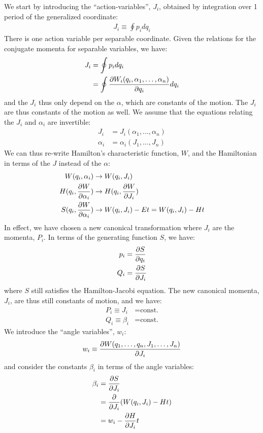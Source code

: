 We start by introducing the ``action-variables'', $J_i$, obtained by integration over 1 period of the generalized coordinate:
\begin{align}
J_i\equiv \oint p_idq_i
\end{align}
There is one action variable per separable coordinate. Given the relations for the conjugate momenta for separable variables, we have:
\begin{align}
J_i&=\oint p_idq_i\nonumber\\
&=\oint \frac{\partial W_i(q_i, \alpha_1, \dots , \alpha_n)}{\partial q_i} dq_i \nonumber\\
\end{align}
and the $J_i$ thus only depend on the $\alpha$, which are constants of the motion. The $J_i$ are thus constants of the motion as well. We assume that the equations relating the $J_i$ and $\alpha_i$ are invertible:
\begin{align}
J_i&=J_i(\alpha_1, \dots , \alpha_n)\nonumber\\
\alpha_i&=\alpha_i(J_1, \dots, J_n)
\end{align} 
We can thus re-write Hamilton's characteristic function, $W$, and the Hamiltonian in terms of the $J$ instead of the $\alpha$:
\begin{align}
W(q_i,\alpha_i)&\to W(q_i, J_i)\nonumber\\
H(q_i,\frac{\partial W}{\partial \alpha_i})&\to H(q_i,\frac{\partial W}{\partial J_i})\nonumber\\
S(q_i,\frac{\partial W}{\partial \alpha_i})&\to W(q_i, J_i)-Et =W(q_i, J_i)-Ht
\end{align}
In effect, we have chosen a new canonical transformation where $J_i$ are the momenta, $P_i$. In terms of the generating function $S$, we have:
\begin{align}
p_i&=\frac{\partial S}{\partial q_i}\nonumber\\
Q_i&=\frac{\partial S}{\partial J_i}
\end{align}
where $S$ still satisfies the Hamilton-Jacobi equation. The new canonical momenta, $J_i$, are thus still constants of motion, and we have:
\begin{align}
P_i\equiv J_i&=\text{const.}\nonumber\\
Q_i\equiv \beta_i&=\text{const.}
\end{align}
We introduce the ``angle variables'', $w_i$:
\begin{align}
w_i\equiv\frac{\partial W(q_1,\dots , q_n,J_1, \dots , J_n)}{\partial J_i}
\end{align}
and consider the constants $\beta_i$ in terms of the angle variables:
\begin{align}
\beta_i&=\frac{\partial S}{\partial J_i}\nonumber\\
&=\frac{\partial }{\partial J_i}(W(q_i, J_i)-Ht)\nonumber\\
&=w_i-\frac{\partial H}{\partial J_i}t
\end{align}
